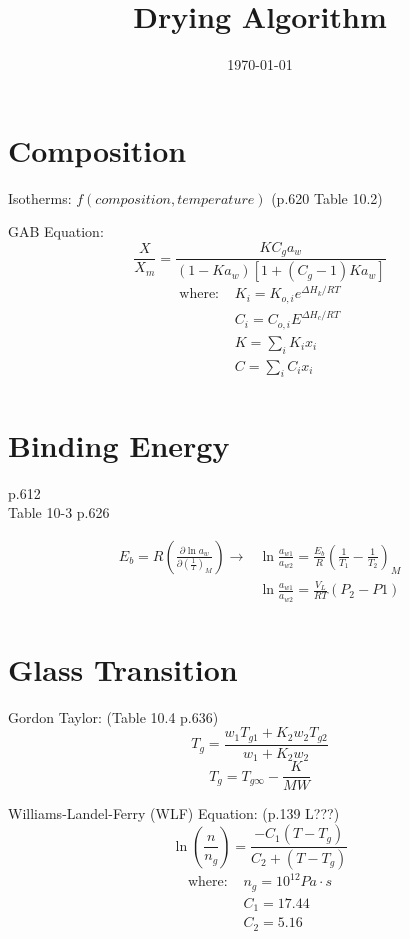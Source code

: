 \documentclass[11pt]{article}
\begin{document}
\title{Drying Algorithm}
\date{\today}
\maketitle

\section{Composition}
Isotherms: $f(composition, temperature)$ (p.620 Table 10.2)

GAB Equation:
\[ \frac{X}{X_m} = \frac{K C_g a_w}{(1-K a_w)\left[1 + (C_g-1)K a_w\right]} \]
\begin{align*}
\text{where: }& K_i = K_{o,i} e^{\Delta H_k/RT}\\
&C_i = C_{o,i} E^{\Delta H_c/RT}\\
&K = \sum_i K_i x_i\\
&C = \sum_i C_i x_i\\
\end{align*}

\section{Binding Energy}
p.612\\
Table 10-3 p.626

\begin{align*}
E_b = R\left(\frac{\partial\ln a_w}{\partial\left(\frac{1}{T}\right)_M}\right) \rightarrow &\ln\frac{a_{w1}}{a_{w2}} = \frac{E_b}{R}\left(\frac{1}{T_1}-\frac{1}{T_2}\right)_M \\
& \ln\frac{a_{w1}}{a_{w2}} = \frac{V_L}{RT}(P_2-P1) \\
\end{align*}

\section{Glass Transition}
Gordon Taylor: (Table 10.4 p.636)
\[ T_g = \frac{w_1 T_{g1} + K_2 w_2 T_{g2}}{w_1 + K_2 w_2} \]
\[ T_g = T_{g\infty} - \frac{K}{MW} \]

Williams-Landel-Ferry (WLF) Equation: (p.139 L???)
\[ \ln\left(\frac{n}{n_g}\right) = \frac{-C_1 (T - T_g)}{C_2 + (T - T_g)} \]
\begin{align*}
\text{where: } &n_g = 10^{12} Pa \cdot s \\
& C_1 = 17.44\\
& C_2 = 5.16\\
\end{align*}
\end{document}
